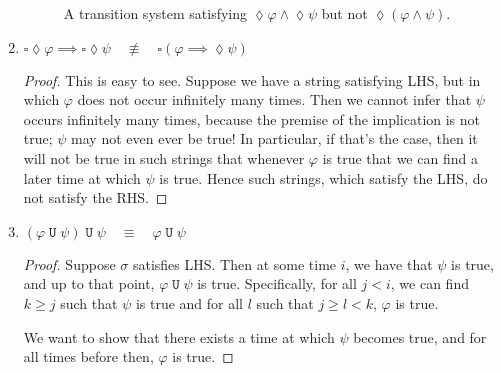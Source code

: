 \documentclass[letterpaper,11pt]{article}
\newcommand{\eventually}{\lozenge}
\newcommand{\always}{\square}
\DeclareMathOperator{\untilOp}{\mathtt{U}}
\newcommand{\until}{\untilOp{}}
\newcommand{\parens}[1]{\left(#1\right)}
\newcommand{\quadequiv}{\quad \equiv \quad}
\newcommand{\nquadequiv}{\quad \not \equiv \quad}
\begin{document}
\begin{enumerate}
\begin{figure}[ht]
            \caption{
                A transition system satisfying
                $\eventually \varphi \land \eventually \psi$
                but not
                $\eventually \parens{\varphi \land \psi}$.
            }
            \label{fig:ts-counterexample-1}
        \end{figure}

        \setcounter{enumi}{6} %
    \item
        $
        \always \eventually \varphi \implies \always \eventually \psi
        \nquadequiv
        \always \parens{
            \varphi \implies \eventually \psi
        }
        $

        \begin{proof}
            This is easy to see. Suppose we have a string satisfying LHS, but
            in which $\varphi$ does not occur infinitely many times. Then we
            cannot infer that $\psi$ occurs infinitely many times, because the
            premise of the implication is not true; $\psi$ may not even ever be
            true! In particular, if that's the case, then it will not be true
            in such strings that whenever $\varphi$ is true that we can find a
            later time at which $\psi$ is true. Hence such strings, which
            satisfy the LHS, do not satisfy the RHS.
        \end{proof}

        \setcounter{enumi}{10}
    \item
        $
        \parens{\varphi \until \psi} \until \psi
        \quadequiv
        \varphi \until \psi
        $

        \begin{proof}
            Suppose $\sigma$ satisfies LHS.
            Then at some time $i$, we have that $\psi$ is true, and up to that
            point, $\varphi \until \psi$ is true. Specifically, for all
            $j < i$, we can find $k \geq j$ such that $\psi$ is true and for
            all $l$ such that $j \geq l < k$, $\varphi$ is true.

            We want to show that there exists a time at which $\psi$ becomes
            true, and for all times before then, $\varphi$ is true.


\end{proof}
\end{enumerate}
\end{document}
